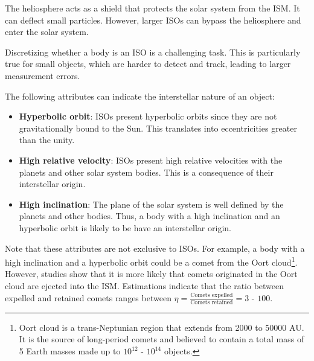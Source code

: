 
The heliosphere acts as a shield that protects the solar system from the ISM. It
can deflect small particles. However, larger ISOs can bypass the heliosphere
and enter the solar system.

Discretizing whether a body is an ISO is a challenging task. This is
particularly true for small objects, which are harder to detect and track,
leading to larger measurement errors. 

The following attributes can indicate the interstellar nature of an object:

\begin{itemize}
    \item \textbf{Hyperbolic orbit}: ISOs present hyperbolic orbits since they
          are not gravitationally bound to the Sun. This translates into
          eccentricities greater than the unity.
    \item \textbf{High relative velocity}: ISOs present high relative velocities
          with the planets and other solar system bodies. This is a consequence
          of their interstellar origin.
    \item \textbf{High inclination}: The plane of the solar system is well
          defined by the planets and other bodies. Thus, a body with a high
          inclination and an hyperbolic orbit is likely to be have an
          interstellar origin.
\end{itemize}

Note that these attributes are not exclusive to ISOs. For example, a body with a
high inclination and a hyperbolic orbit could be a comet from the Oort
cloud\footnote{ Oort cloud is a trans-Neptunian region that extends from 2000 to
50000 AU. It is the source of long-period comets and believed to contain a total
mass of 5 Earth masses made up to $10^{12}$ - $10^{14}$ objects. }. However,
studies \cite{francis2005} show that it is more likely that comets originated in the Oort cloud are
ejected into the ISM. Estimations indicate that the ratio between expelled and
retained comets ranges between $\eta = \frac{\text{Comets
expelled}}{\text{Comets retained}} = 3 \text{ - } 100$.
